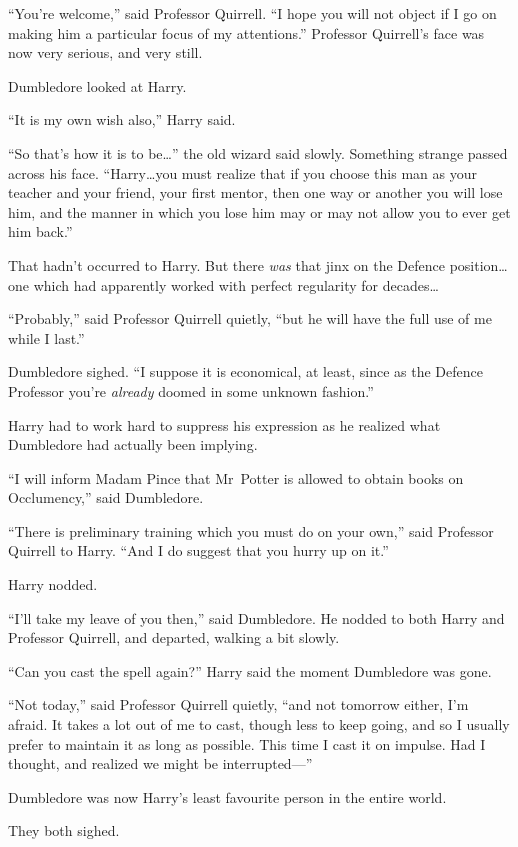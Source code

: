 “You’re welcome,” said Professor Quirrell.
“I hope you will not object if I go on making him a particular focus of my attentions.” Professor Quirrell’s face was now very serious, and very still.

Dumbledore looked at Harry.

“It is my own wish also,” Harry said.

“So that’s how it is to be…” the old wizard said slowly. Something strange passed across his face.
“Harry…you must realize that if you choose this man as your teacher and your friend, your first mentor, then one way or another you will lose him, and the manner in which you lose him may or may not allow you to ever get him back.”

That hadn’t occurred to Harry. But there \emph{was} that jinx on the Defence position…one which had apparently worked with perfect regularity for decades…

“Probably,” said Professor Quirrell quietly, “but he will have the full use of me while I last.”

Dumbledore sighed.
“I suppose it is economical, at least, since as the Defence Professor you’re \emph{already} doomed in some unknown fashion.”

Harry had to work hard to suppress his expression as he realized what Dumbledore had actually been implying.

“I will inform Madam Pince that Mr~Potter is allowed to obtain books on Occlumency,” said Dumbledore.

“There is preliminary training which you must do on your own,” said Professor Quirrell to Harry.
“And I do suggest that you hurry up on it.”

Harry nodded.

“I’ll take my leave of you then,” said Dumbledore. He nodded to both Harry and Professor Quirrell, and departed, walking a bit slowly.

“Can you cast the spell again?” Harry said the moment Dumbledore was gone.

“Not today,” said Professor Quirrell quietly, “and not tomorrow either, I’m afraid. It takes a lot out of me to cast, though less to keep going, and so I usually prefer to maintain it as long as possible. This time I cast it on impulse. Had I thought, and realized we might be interrupted—”

Dumbledore was now Harry’s least favourite person in the entire world.

They both sighed.

